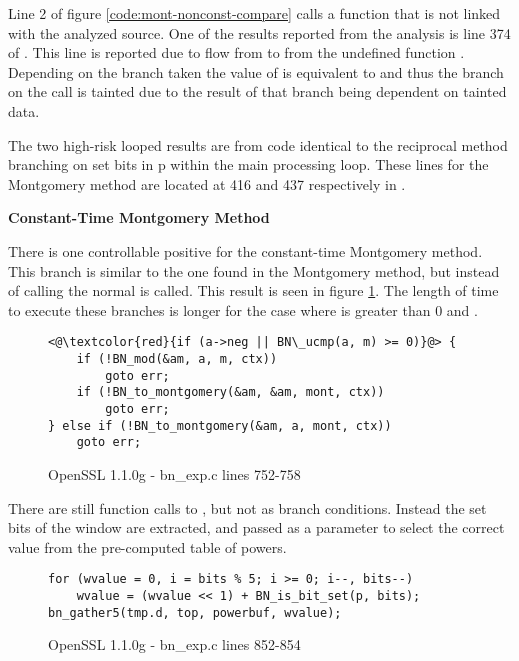 Line 2 of figure \ref{code:mont-nonconst-compare} calls a function that is not
linked with the analyzed source. One of the results reported from the analysis
is line 374 of . This line is reported due to flow from
 to  from the undefined function .
Depending on the branch taken the value of  is equivalent to
 and thus the branch on the  call is
tainted due to the result of that branch being dependent on tainted data.

The two high-risk looped results are from code identical to the reciprocal
method branching on set bits in p within the main processing loop. These lines
for the Montgomery method are located at 416 and 437 respectively in
.

\noindent
\textbf{Constant-Time Montgomery Method}

There is one controllable positive for the constant-time Montgomery method. This
branch is similar to the one found in the Montgomery method, but instead of
calling  the normal  is called. This result is
seen in figure \ref{code:mont-const-compare}. The length of time to execute these
branches is longer for the case where  is greater than 0 and
.

\begin{figure}[h!]
\begin{lstlisting}
<@\textcolor{red}{if (a->neg || BN\_ucmp(a, m) >= 0)}@> {
    if (!BN_mod(&am, a, m, ctx))
        goto err;
    if (!BN_to_montgomery(&am, &am, mont, ctx))
        goto err;
} else if (!BN_to_montgomery(&am, a, mont, ctx))
    goto err;
\end{lstlisting}
\caption{OpenSSL 1.1.0g - bn\_exp.c lines 752-758}
\label{code:mont-const-compare}
\end{figure}

There are still function calls to , but not as branch
conditions. Instead the set bits of the window are extracted, and passed as a
parameter to select the correct value from the pre-computed table of powers.


\begin{figure}[h!]
\begin{lstlisting}
for (wvalue = 0, i = bits % 5; i >= 0; i--, bits--)
    wvalue = (wvalue << 1) + BN_is_bit_set(p, bits);
bn_gather5(tmp.d, top, powerbuf, wvalue);
\end{lstlisting}
\caption{OpenSSL 1.1.0g - bn\_exp.c lines 852-854}
\label{code:mont-const-scatter-gather}
\end{figure}

